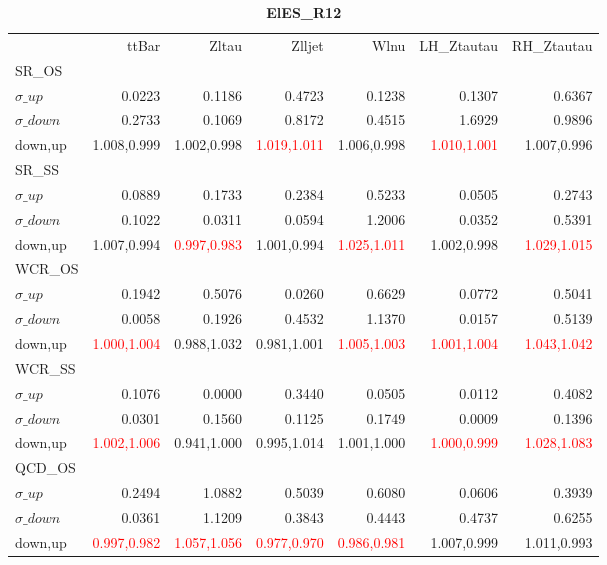 \documentclass[11pt,oneside,a4paper]{article}
\begin{document}
\begin{table}
\centering
\caption{\bf{ElES\_R12}}
\begin{tabular}{lrrrrrr}
 & ttBar & Zltau & Zlljet & Wlnu & LH\_Ztautau & RH\_Ztautau \\
SR\_OS &  &  &  &  &  &  \\
$\sigma\_up$ & 0.0223 & 0.1186 & 0.4723 & 0.1238 & 0.1307 & 0.6367 \\
$\sigma\_down$ & 0.2733 & 0.1069 & 0.8172 & 0.4515 & 1.6929 & 0.9896 \\
down,up & 1.008,0.999 & 1.002,0.998 & \textcolor{red}{1.019,1.011} & 1.006,0.998 & \textcolor{red}{1.010,1.001} & 1.007,0.996 \\

\hline
SR\_SS &  &  &  &  &  &  \\
$\sigma\_up$ & 0.0889 & 0.1733 & 0.2384 & 0.5233 & 0.0505 & 0.2743 \\
$\sigma\_down$ & 0.1022 & 0.0311 & 0.0594 & 1.2006 & 0.0352 & 0.5391 \\
down,up & 1.007,0.994 & \textcolor{red}{0.997,0.983} & 1.001,0.994 & \textcolor{red}{1.025,1.011} & 1.002,0.998 & \textcolor{red}{1.029,1.015} \\

\hline
WCR\_OS &  &  &  &  &  &  \\
$\sigma\_up$ & 0.1942 & 0.5076 & 0.0260 & 0.6629 & 0.0772 & 0.5041 \\
$\sigma\_down$ & 0.0058 & 0.1926 & 0.4532 & 1.1370 & 0.0157 & 0.5139 \\
down,up & \textcolor{red}{1.000,1.004} & 0.988,1.032 & 0.981,1.001 & \textcolor{red}{1.005,1.003} & \textcolor{red}{1.001,1.004} & \textcolor{red}{1.043,1.042} \\

\hline
WCR\_SS &  &  &  &  &  &  \\
$\sigma\_up$ & 0.1076 & 0.0000 & 0.3440 & 0.0505 & 0.0112 & 0.4082 \\
$\sigma\_down$ & 0.0301 & 0.1560 & 0.1125 & 0.1749 & 0.0009 & 0.1396 \\
down,up & \textcolor{red}{1.002,1.006} & 0.941,1.000 & 0.995,1.014 & 1.001,1.000 & \textcolor{red}{1.000,0.999} & \textcolor{red}{1.028,1.083} \\

\hline
QCD\_OS &  &  &  &  &  &  \\
$\sigma\_up$ & 0.2494 & 1.0882 & 0.5039 & 0.6080 & 0.0606 & 0.3939 \\
$\sigma\_down$ & 0.0361 & 1.1209 & 0.3843 & 0.4443 & 0.4737 & 0.6255 \\
down,up & \textcolor{red}{0.997,0.982} & \textcolor{red}{1.057,1.056} & \textcolor{red}{0.977,0.970} & \textcolor{red}{0.986,0.981} & 1.007,0.999 & 1.011,0.993 \\


\end{tabular}
\end{table}
\end{document}
